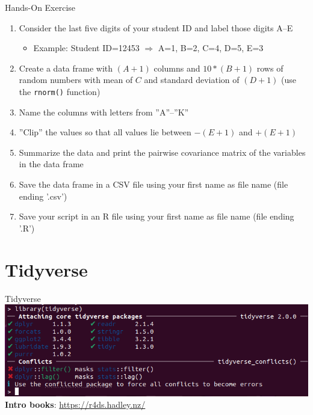 \documentclass[ignorenonframetext,xcolor=x11names]{beamer}
\begin{document}
\begin{frame}{Hands-On Exercise}
\begin{enumerate}
   \item Consider the last five digits of your student ID and label those digits A--E
   \begin{itemize}
      \item Example: Student ID=12453 $\Rightarrow$ A=1, B=2, C=4, D=5, E=3
   \end{itemize}
   \item Create a data frame with $(A+1)$ columns and $10*(B+1)$ rows of random numbers with mean of $C$ and standard deviation of $(D+1)$ (use the \texttt{rnorm()} function)
   \item Name the columns with letters from ''A''--''K''
   \item ''Clip'' the values so that all values lie between $-(E+1)$ and $+(E+1)$
   \item Summarize the data and print the pairwise covariance matrix of the variables in the data frame
   \item Save the data frame in a CSV file using your first name as file name (file ending '.csv')
   \item Save your script in an R file using your first name as file name (file ending '.R')
\end{enumerate}
\end{frame}

\section{Tidyverse}

\begin{frame}{Tidyverse}
\includegraphics[width=\textwidth]{screen2.png}\\

\textbf{Intro books}: \url{https://r4ds.hadley.nz/}
\end{frame}
\end{document}
